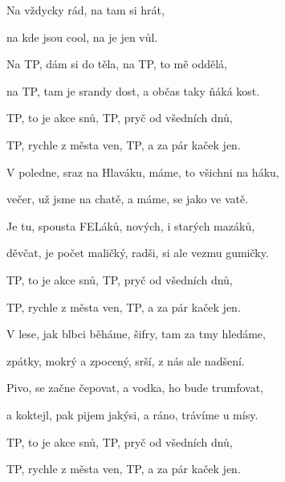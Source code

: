 

\zs
Na  vždycky  rád,
na  tam si  hrát,

na  kde jsou  cool,
na  je jen  vůl.
\ks

\zs
Na TP, dám si do těla,
na TP, to mě oddělá,

na TP, tam je srandy dost,
a občas taky ňáká kost.
\ks

\zr
TP, to je akce snů,
TP, pryč od všedních dnů,

TP, rychle z města ven,
TP, a za pár kaček jen.
\kr

\zs
V poledne, sraz na Hlaváku,
máme, to všichni na háku,

večer, už jsme na chatě,
a máme, se jako ve vatě.
\ks

\zs
Je tu, spousta FELáků,
nových, i starých mazáků,

děvčat, je počet maličký,
radši, si ale vezmu gumičky.
\ks

\zr
TP, to je akce snů,
TP, pryč od všedních dnů,

TP, rychle z města ven,
TP, a za pár kaček jen.
\kr

\zs
V lese, jak blbci běháme,
šifry, tam za tmy hledáme,

zpátky, mokrý a zpocený,
srší, z nás ale nadšení.
\ks

\zs
Pivo, se začne čepovat,
a vodka, ho bude trumfovat,

a koktejl, pak pijem jakýsi,
a ráno, trávíme u mísy.
\ks

\zr
TP, to je akce snů,
TP, pryč od všedních dnů,

TP, rychle z města ven,
TP, a za pár kaček jen.
\kr

\kp 

